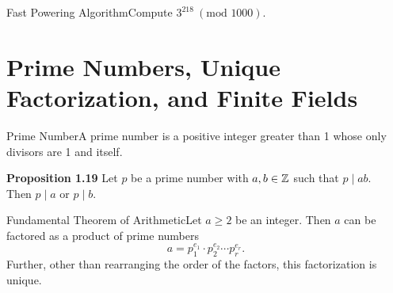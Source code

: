 \begin{example}
    {Fast Powering Algorithm}Compute \(3^{218} \ (\text{mod } 1000)\).
\end{example}



\section{Prime Numbers, Unique Factorization, and Finite Fields}

\begin{definition}
    {Prime Number}A prime number is a positive integer greater than 1 whose only divisors are 1 and itself.
\end{definition}

\textbf{Proposition 1.19} Let \(p\) be a prime number with \(a,b \in \mathbb{Z}\) such that \(p \mid ab\). \\
Then \(p \mid a\) or \(p \mid b\). \\

\begin{theorem}
    {Fundamental Theorem of Arithmetic}Let \(a \geq 2\) be an integer. Then \(a\) can be factored as a product of prime numbers \[a = p_1^{e_1} \cdot p_2^{e_2} \cdots p_r^{e_r}.\] Further, other than rearranging the order of the factors, this factorization is unique.
\end{theorem}


